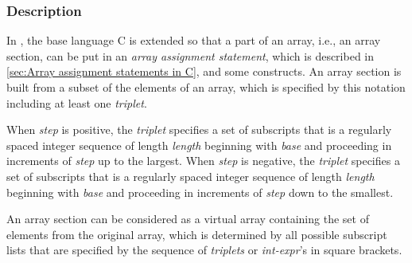 \subsubsection*{Description}

In {\XMPC}, the base language C is extended so that a part of an array,
i.e., an array section, can be put in an {\it array assignment
statement}, which is described in \ref{sec:Array assignment statements
in C}, and some {\XMP} constructs. An array section is built from a
subset of the elements of an array, which is specified by this notation
including at least one {\it triplet}.

When {\it step} is positive, the {\it triplet} specifies a set of
subscripts that is a regularly spaced integer sequence of length {\it
length} beginning with {\it base} and proceeding in increments of {\it
step} up to the largest.
%
When {\it step} is negative, the {\it triplet} specifies a set of
subscripts that is a regularly spaced integer sequence of length {\it
length} beginning with {\it base} and proceeding in increments of {\it
step} down to the smallest.




An array section can be considered as a virtual array containing the set
of elements from the original array, which is determined by all possible
subscript lists that are specified by the sequence of {\it triplets} or
{\it int-expr}'s in square brackets.

